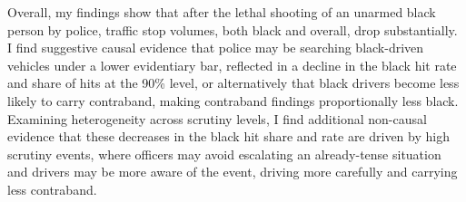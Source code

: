 Overall, my findings show that after the lethal shooting of an unarmed black person by police, traffic stop volumes, both black and overall, drop substantially. I find suggestive causal evidence that police may be searching black-driven vehicles under a lower evidentiary bar, reflected in a decline in the black hit rate and share of hits at the 90\% level, or alternatively that black drivers become less likely to carry contraband, making contraband findings proportionally less black. Examining heterogeneity across scrutiny levels, I find additional non-causal evidence that these decreases in the black hit share and rate are driven by high scrutiny events, where officers may avoid escalating an already-tense situation and drivers may be more aware of the event, driving more carefully and carrying less contraband. \\
